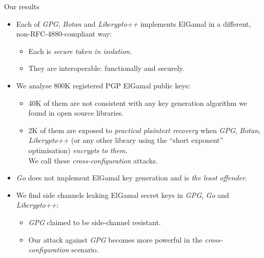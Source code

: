 \documentclass[aspectratio=169]{beamer}
\begin{document}
\begin{frame}{Our results}
  \begin{itemize}
    \setlength{\itemsep}{1em}
  \item Each of \emph{GPG}, \emph{Botan} and \emph{Libcrypto++}
    implements ElGamal in a different, non-RFC-4880-compliant way:
    \begin{itemize}
    \item Each is \emph{secure taken in isolation}.
    \item They are interoperable: functionally and securely.
    \end{itemize}
  \item We analyse 800K registered PGP ElGamal public keys:
    \begin{itemize}
    \item 40K of them are not consistent with any key
      generation algorithm we found in open source libraries.
    \item 2K of them are exposed to \emph{practical plaintext
        recovery} when \emph{GPG}, \emph{Botan}, \emph{Libcrypto++}
      (or any other library using the ``short exponent'' optimisation)
      \emph{encrypts to them}.\\
      We call these \emph{cross-configuration} attacks.
    \end{itemize}
  \item \emph{Go} does not implement ElGamal key generation and is \emph{the
    least offender}.
  \item We find side channels leaking ElGamal secret keys in \emph{GPG}, \emph{Go} and
    \emph{Libcrypto++}:
    \begin{itemize}
    \item \emph{GPG} claimed to be side-channel resistant.
    \item Our attack against \emph{GPG} becomes more powerful in the
      \emph{cross-configuration} scenario.
    \end{itemize}
  \end{itemize}
\end{frame}
\end{document}

